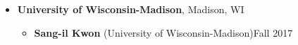 \documentclass[letterpaper, 11pt]{article}
\begin{document}
\begin{itemize}[leftmargin=*]
\begin{itemize}[leftmargin=*]
  \end{itemize}
\item[] {\bf University of Wisconsin-Madison}, Madison, WI
  \begin{itemize}[leftmargin=*]
  \item[] {\bf Sang-il Kwon} (University of Wisconsin-Madison)\hfill Fall 2017
  \end{itemize}
\end{itemize}
\end{document}
